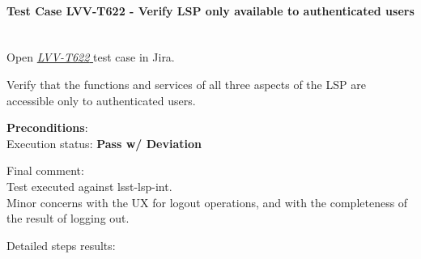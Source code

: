 \documentclass[DM,STR,toc]{lsstdoc}
\begin{document}
\paragraph{Test Case LVV-T622 - Verify LSP only available to authenticated users
 }\mbox{}\\

Open  \href{https://jira.lsstcorp.org/secure/Tests.jspa#/testCase/LVV-T622}{\textit{ LVV-T622 } }
test case in Jira.

Verify that the functions and services of all three aspects of the LSP
are accessible only to authenticated users.


\textbf{ Preconditions}:\\


Execution status: {\bf Pass w/ Deviation }

Final comment:\\Test executed against lsst-lsp-int. ~\\
Minor concerns with the UX for logout operations, and with the
completeness of the result of logging out.



Detailed steps results:
\end{document}
